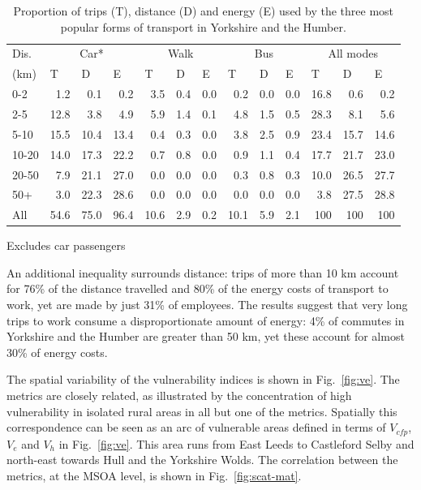 \documentclass[a4paper, 11pt, twoside]{Thesis}
\begin{document}
\begin{table}[htbp]
\caption[Proportion of trips (T), distance (D) and energy (E)
by mode]{Proportion of trips (T), distance (D) and energy (E)
used by the three most
popular forms of transport in Yorkshire and the Humber.}
\begin{center}
\begin{tabular}{lrrr|rrr|rrr|rrr}
\toprule
Dis. & \multicolumn{ 3}{c}{Car*} & \multicolumn{ 3}{c}{Walk} & \multicolumn{
3}{c}{Bus} & \multicolumn{ 3}{c}{All modes} \\
(km) & \multicolumn{1}{l}{T} & \multicolumn{1}{l}{D} & \multicolumn{1}{l}{E} &
\multicolumn{1}{l}{T} & \multicolumn{1}{l}{D} & \multicolumn{1}{l}{E} &
\multicolumn{1}{l}{T} &
\multicolumn{1}{l}{D} & \multicolumn{1}{l}{E} & \multicolumn{1}{l}{T} &
\multicolumn{1}{l}{D} & \multicolumn{1}{l}{E} \\ \midrule
0-2 & 1.2 & 0.1 & 0.2 & 3.5 & 0.4 & 0.0 & 0.2 & 0.0 & 0.0 & 16.8 & 0.6 & 0.2 \\
2-5 & 12.8 & 3.8 & 4.9 & 5.9 & 1.4 & 0.1 & 4.8 & 1.5 & 0.5 & 28.3 & 8.1 & 5.6 \\
5-10 & 15.5 & 10.4 & 13.4 & 0.4 & 0.3 & 0.0 & 3.8 & 2.5 & 0.9 & 23.4 & 15.7 &
14.6 \\
10-20 & 14.0 & 17.3 & 22.2 & 0.7 & 0.8 & 0.0 & 0.9 & 1.1 & 0.4 & 17.7 & 21.7 &
23.0 \\
20-50 & 7.9 & 21.1 & 27.0 & 0.0 & 0.0 & 0.0 & 0.3 & 0.8 & 0.3 & 10.0 & 26.5 &
27.7 \\
50+ & 3.0 & 22.3 & 28.6 & 0.0 & 0.0 & 0.0 & 0.0 & 0.0 & 0.0 & 3.8 & 27.5 & 28.8
\\
All & 54.6 & 75.0 & 96.4 & 10.6 & 2.9 & 0.2 & 10.1 & 5.9 & 2.1 & 100 & 100 & 100
\\ \bottomrule
\end{tabular}\end{center}
\label{t:props}
{\footnotesize *Excludes car passengers}
\end{table}

An additional inequality surrounds distance: trips of more than 10 km account
for
76\% of the distance travelled and 80\% of the energy costs of transport to
work,
yet are made by just 31\% of employees. The results suggest that very long trips
to work consume a disproportionate amount of energy: 4\% of commutes in
Yorkshire and
the Humber are greater than 50 km, yet these account for almost 30\% of energy
costs.


The spatial variability of the vulnerability indices is shown in
Fig.~\ref{fig:ve}.
The metrics are closely related, as illustrated by the concentration of
high vulnerability in isolated rural areas in all but one of the metrics.
Spatially this correspondence can be seen as an arc of vulnerable areas
defined in terms of $V_{cfp}$, $V_e$ and $V_h$ in Fig.~\ref{fig:ve}.  This
area runs from East Leeds to Castleford Selby and north-east towards Hull and
the Yorkshire Wolds.
The correlation between the metrics, at the MSOA level, is shown in
Fig.~\ref{fig:scat-mat}.
\end{document}
